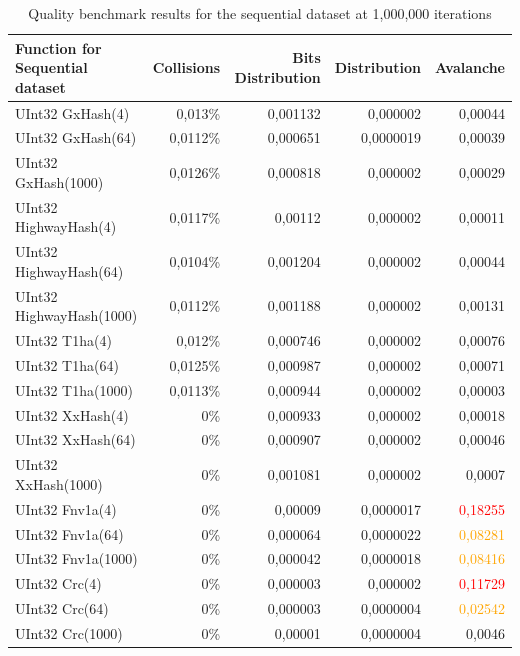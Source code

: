 \documentclass[10pt]{article}
\begin{document}
\begin{table}[H]
\centering
\begin{tabular}{|l|r|r|r|r|}
\hline
\textbf{Function for Sequential dataset} & \textbf{Collisions} & \textbf{Bits Distribution} & \textbf{Distribution} & \textbf{Avalanche} \\
\hline
UInt32 GxHash(4)                & 0,013\% & 0,001132  & 0,000002 & 0,00044 \\
UInt32 GxHash(64)               & 0,0112\% & 0,000651  & 0,0000019 & 0,00039 \\
UInt32 GxHash(1000)             & 0,0126\% & 0,000818  & 0,000002 & 0,00029 \\
UInt32 HighwayHash(4)            & 0,0117\% & 0,00112   & 0,000002 & 0,00011 \\
UInt32 HighwayHash(64)           & 0,0104\% & 0,001204  & 0,000002 & 0,00044 \\
UInt32 HighwayHash(1000)         & 0,0112\% & 0,001188  & 0,000002 & 0,00131 \\
UInt32 T1ha(4)                   & 0,012\%  & 0,000746  & 0,000002 & 0,00076 \\
UInt32 T1ha(64)                  & 0,0125\% & 0,000987  & 0,000002 & 0,00071 \\
UInt32 T1ha(1000)                & 0,0113\% & 0,000944  & 0,000002 & 0,00003 \\
UInt32 XxHash(4)                & 0\%      & 0,000933  & 0,000002 & 0,00018 \\
UInt32 XxHash(64)               & 0\%      & 0,000907  & 0,000002 & 0,00046 \\
UInt32 XxHash(1000)             & 0\%      & 0,001081  & 0,000002 & 0,0007 \\
UInt32 Fnv1a(4)                 & 0\%      & 0,00009   & 0,0000017 & \textcolor{red}{0,18255} \\
UInt32 Fnv1a(64)                & 0\%      & 0,000064  & 0,0000022 & \textcolor{orange}{0,08281} \\
UInt32 Fnv1a(1000)              & 0\%      & 0,000042  & 0,0000018 & \textcolor{orange}{0,08416} \\
UInt32 Crc(4)                   & 0\%      & 0,000003  & 0,000002 & \textcolor{red}{0,11729} \\
UInt32 Crc(64)                  & 0\%      & 0,000003  & 0,0000004 & \textcolor{orange}{0,02542} \\
UInt32 Crc(1000)                & 0\%      & 0,00001   & 0,0000004 & 0,0046 \\
\hline
\end{tabular}
\caption{Quality benchmark results for the sequential dataset at 1,000,000 iterations}
\label{tab:scores-sequential}
\end{table}
\end{document}
